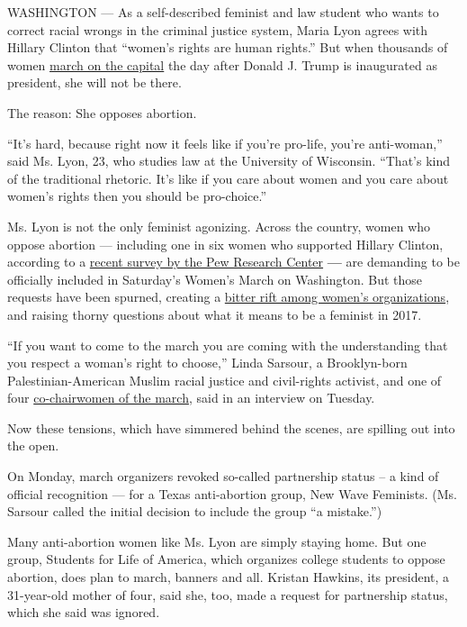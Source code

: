 WASHINGTON --- As a self-described feminist and law student who wants to
correct racial wrongs in the criminal justice system, Maria Lyon agrees
with Hillary Clinton that ``women's rights are human rights.'' But when
thousands of women
\href{https://www.nytimes.com/interactive/2017/01/10/us/politics/womens-march-guide.html}{march
on the capital} the day after Donald J. Trump is inaugurated as
president, she will not be there.

The reason: She opposes abortion.

``It's hard, because right now it feels like if you're pro-life, you're
anti-woman,'' said Ms. Lyon, 23, who studies law at the University of
Wisconsin. ``That's kind of the traditional rhetoric. It's like if you
care about women and you care about women's rights then you should be
pro-choice.''

Ms. Lyon is not the only feminist agonizing. Across the country, women
who oppose abortion --- including one in six women who supported Hillary
Clinton, according to a
\href{http://www.pewresearch.org/fact-tank/2016/11/03/women-drive-increase-in-democratic-support-for-legal-abortion/}{recent
survey by the Pew Research Center} \textbf{---} are demanding to be
officially included in Saturday's Women's March on Washington. But those
requests have been spurned, creating a
\href{https://www.nytimes.com/2017/01/09/us/womens-march-on-washington-opens-contentious-dialogues-about-race.html?_r=0}{bitter
rift among women's organizations}, and raising thorny questions about
what it means to be a feminist in 2017.

``If you want to come to the march you are coming with the understanding
that you respect a woman's right to choose,'' Linda Sarsour, a
Brooklyn-born Palestinian-American Muslim racial justice and
civil-rights activist, and one of four
\href{https://www.womensmarch.com/team/}{co-chairwomen of the march},
said in an interview on Tuesday.

Now these tensions, which have simmered behind the scenes, are spilling
out into the open.

On Monday, march organizers revoked so-called partnership status -- a
kind of official recognition --- for a Texas anti-abortion group, New
Wave Feminists. (Ms. Sarsour called the initial decision to include the
group ``a mistake.'')

Many anti-abortion women like Ms. Lyon are simply staying home. But one
group, Students for Life of America, which organizes college students to
oppose abortion, does plan to march, banners and all. Kristan Hawkins,
its president, a 31-year-old mother of four, said she, too, made a
request for partnership status, which she said was ignored.

